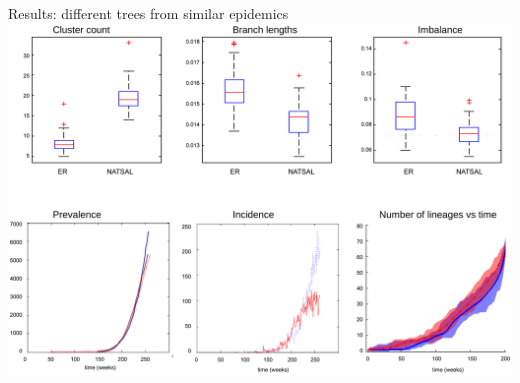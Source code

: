 \documentclass{beamer}
\begin{document}
\begin{frame}{Results: different trees from similar epidemics}
    \includegraphics[width=\textwidth]{f9}
\end{frame}
\end{document}
